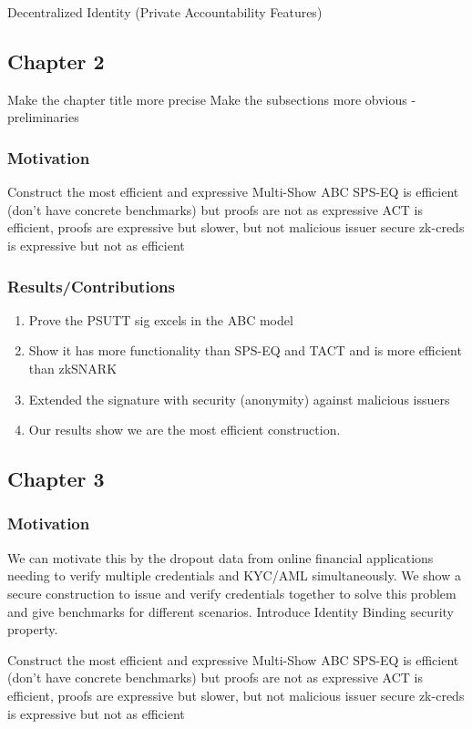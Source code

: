 Decentralized Identity (Private Accountability Features)



\subsection{Chapter 2}
Make the chapter title more precise
Make the subsections more obvious - preliminaries 


\subsubsection{Motivation}
Construct the most efficient and expressive Multi-Show ABC
SPS-EQ is efficient (don't have concrete benchmarks) but proofs are not as expressive
ACT is efficient, proofs are expressive but slower, but not malicious issuer secure
zk-creds is expressive but not as efficient


\subsubsection{Results/Contributions}
\begin{enumerate}
    \item Prove the PSUTT sig excels in the ABC model
    \item Show it has more functionality than SPS-EQ and TACT and is more efficient than zkSNARK
    \item Extended the signature with security (anonymity) against malicious issuers
    \item Our results show we are the most efficient construction.
\end{enumerate}




\subsection{Chapter 3}
\subsubsection{Motivation}
We can motivate this by the dropout data from online financial applications needing to verify multiple credentials and KYC/AML simultaneously. 
We show a secure construction to issue and verify credentials together to solve this problem and give benchmarks for different scenarios.
Introduce Identity Binding security property.

Construct the most efficient and expressive Multi-Show ABC
SPS-EQ is efficient (don't have concrete benchmarks) but proofs are not as expressive
ACT is efficient, proofs are expressive but slower, but not malicious issuer secure
zk-creds is expressive but not as efficient


